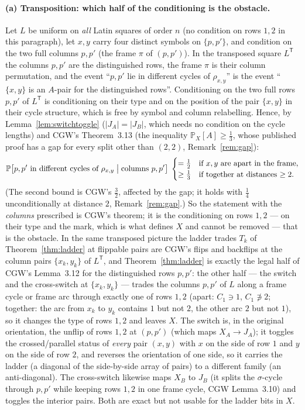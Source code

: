\documentclass[11pt]{article}
\theoremstyle{definition}
\renewcommand{\Pr}{\mathbb{P}}
\begin{document}
\paragraph{(a) Transposition: which half of the conditioning is the
obstacle.}  Let $L$ be uniform on \emph{all} Latin squares of order
$n$ (no condition on rows $1,2$ in this paragraph), let $x,y$ carry
four distinct symbols on $\{p,p'\}$, and condition on the two full
columns $p,p'$ (the frame $\pi$ of $(p,p')$).  In the transposed square $L^{\mathsf T}$ the
columns $p,p'$ are the distinguished rows, the frame $\pi$ is their
column permutation, and the event ``$p,p'$ lie in different cycles of
$\rho_{x,y}$'' is the event ``$\{x,y\}$ is an $A$-pair for the
distinguished rows''.  Conditioning on the two full rows $p,p'$ of
$L^{\mathsf T}$ is conditioning on their type and on the position of
the pair $\{x,y\}$ in their cycle structure, which is free by symbol
and column relabelling.  Hence, by Lemma~\ref{lem:switchtoggle}
($|J_A|=|J_B|$, which needs no condition on the cycle lengths) and
CGW's Theorem~3.13 (the inequality $\Pr_X[A]\ge\tfrac13$, whose published proof has a gap for every split other than $(2,2)$, Remark~\ref{rem:gap}):
\begin{equation}\label{eq:CPcols}
\Pr\bigl[p,p'\text{ in different cycles of }\rho_{x,y}\bigm|\text{columns }p,p'\bigr]
\;\begin{cases}=\tfrac12&\text{if $x,y$ are apart in the frame},\\ \ge\tfrac13&\text{if together at distances $\ge2$}.\end{cases}
\end{equation}
(The second bound is CGW's $\tfrac32$, affected by the gap; it holds with $\tfrac14$ unconditionally at distance $2$, Remark~\ref{rem:gap}.)  So the statement with the \emph{columns} prescribed is CGW's theorem; it is the
conditioning on rows $1,2$ --- on their type and the mark, which is
what defines $X$ and cannot be removed --- that is the obstacle.
In the same transposed picture the ladder trades $T_k$ of
Theorem~\ref{thm:ladder} at flippable pairs are CGW's flips and
backflips at the column pairs $\{x_k,y_k\}$ of $L^{\mathsf T}$, and
Theorem~\ref{thm:ladder} is exactly the legal half of CGW's
Lemma~3.12 for the distinguished rows $p,p'$: the other half --- the
switch and the cross-switch at $\{x_k,y_k\}$ --- trades the columns
$p,p'$ of $L$ along a frame cycle or frame arc through exactly one of
rows $1,2$ (apart: $C_1\ni1$, $C_1\not\ni2$; together: the arc from
$x_k$ to $y_k$ contains $1$ but not $2$, the other arc $2$ but not
$1$), so it changes the type of rows $1,2$ and leaves $X$.  The switch
is, in the original orientation, the unflip of rows $1,2$ at $(p,p')$
(which maps $X_A\to J_A$); it toggles the crossed/parallel status of
\emph{every} pair $(x,y)$ with $x$ on the side of row $1$ and $y$ on
the side of row $2$, and reverses the orientation of one side, so it
carries the ladder (a diagonal of the side-by-side array of pairs) to
a different family (an anti-diagonal).  The cross-switch likewise maps
$X_B$ to $J_B$ (it splits the $\sigma$-cycle through $p,p'$ while
keeping rows $1,2$ in one frame cycle, CGW Lemma~3.10) and toggles
the interior pairs.  Both are exact but not usable for the ladder bits
in $X$.
\end{document}
